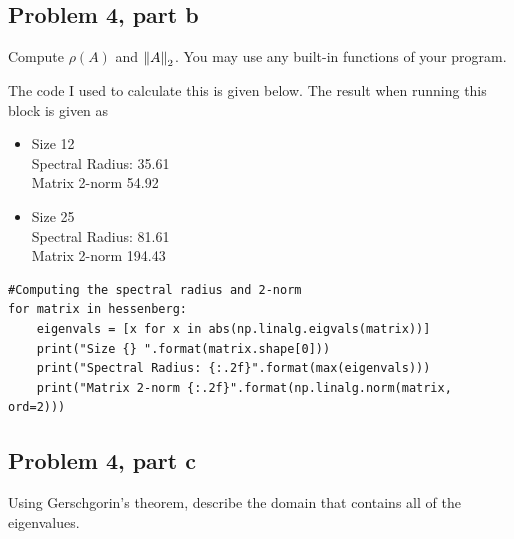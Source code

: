 \newpage
\subsection{Problem 4, part b}
Compute $\rho(A)$ and $\norm{A}_2$. You may use any built-in functions of your program.
\partbreak
\begin{solution}

    The code I used to calculate this is given below. The result when running this block is given as 
    \begin{itemize}
        \item Size 12 \\
            Spectral Radius: 35.61 \\
            Matrix 2-norm 54.92 \\
        
        \item Size 25 \\
            Spectral Radius: 81.61 \\
            Matrix 2-norm 194.43
    \end{itemize}

\begin{lstlisting}
#Computing the spectral radius and 2-norm
for matrix in hessenberg:
    eigenvals = [x for x in abs(np.linalg.eigvals(matrix))]
    print("Size {} ".format(matrix.shape[0]))
    print("Spectral Radius: {:.2f}".format(max(eigenvals)))
    print("Matrix 2-norm {:.2f}".format(np.linalg.norm(matrix, ord=2)))
\end{lstlisting}
\end{solution}

\subsection{Problem 4, part c}
Using Gerschgorin’s theorem, describe the domain that contains all of the eigenvalues.

